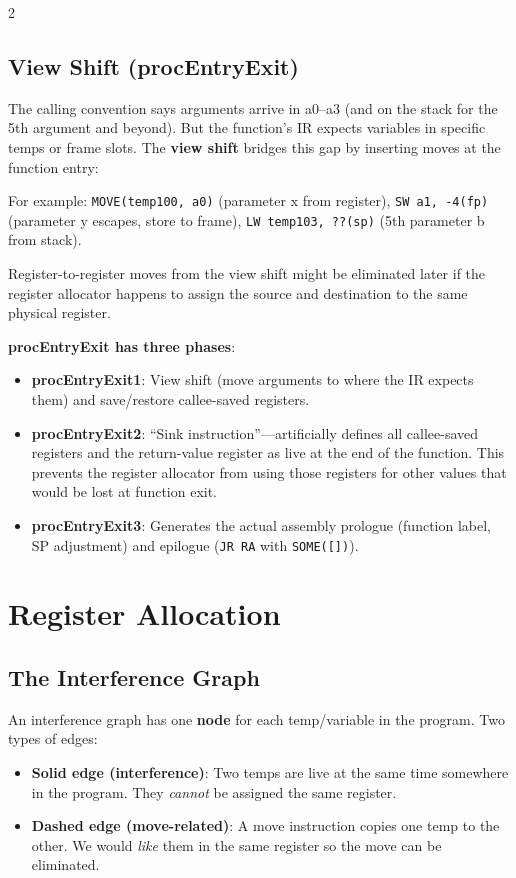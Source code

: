 \documentclass[9pt,landscape]{extarticle}
\begin{document}
\begin{multicols}{2}
\subsection{View Shift (procEntryExit)}

The calling convention says arguments arrive in a0--a3 (and on the stack for the 5th argument and beyond). But the function's IR expects variables in specific temps or frame slots. The \textbf{view shift} bridges this gap by inserting moves at the function entry:

For example: \texttt{MOVE(temp100, a0)} (parameter x from register), \texttt{SW a1, -4(fp)} (parameter y escapes, store to frame), \texttt{LW temp103, ??(sp)} (5th parameter b from stack).

Register-to-register moves from the view shift might be eliminated later if the register allocator happens to assign the source and destination to the same physical register.

\textbf{procEntryExit has three phases}:
\begin{itemize}
  \item \textbf{procEntryExit1}: View shift (move arguments to where the IR expects them) and save/restore callee-saved registers.
  \item \textbf{procEntryExit2}: ``Sink instruction''---artificially defines all callee-saved registers and the return-value register as live at the end of the function. This prevents the register allocator from using those registers for other values that would be lost at function exit.
  \item \textbf{procEntryExit3}: Generates the actual assembly prologue (function label, SP adjustment) and epilogue (\texttt{JR RA} with \texttt{SOME([])}).
\end{itemize}

\section{Register Allocation}

\subsection{The Interference Graph}

An interference graph has one \textbf{node} for each temp/variable in the program. Two types of edges:
\begin{itemize}
  \item \textbf{Solid edge (interference)}: Two temps are live at the same time somewhere in the program. They \emph{cannot} be assigned the same register.
  \item \textbf{Dashed edge (move-related)}: A move instruction copies one temp to the other. We would \emph{like} them in the same register so the move can be eliminated.
\end{itemize}


\end{multicols}
\end{document}
